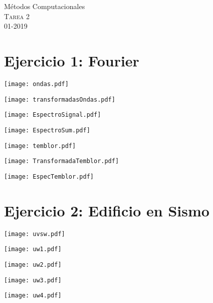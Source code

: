 \documentclass[11pt,letterpaper]{exam}
\begin{document}
\begin{center}
{\Large Métodos Computacionales} \\
\textsc{Tarea 2}\\
01-2019\\
\end{center}

\noindent
\section{Ejercicio 1: Fourier}
\begin{center}
\texttt{[image: ondas.pdf]}
\end{center}

\begin{center}
\texttt{[image: transformadasOndas.pdf]}
\end{center}

\begin{center}
\texttt{[image: EspectroSignal.pdf]}
\end{center}

\begin{center}
\texttt{[image: EspectroSum.pdf]}
\end{center}

\begin{center}
\texttt{[image: temblor.pdf]}
\end{center}

\begin{center}
\texttt{[image: TransformadaTemblor.pdf]}
\end{center}

\begin{center}
\texttt{[image: EspecTemblor.pdf]}
\end{center}

\section{Ejercicio 2: Edificio en Sismo}
\begin{center}
\texttt{[image: uvsw.pdf]}
\end{center}

\begin{center}
\texttt{[image: uw1.pdf]}
\end{center}

\begin{center}
\texttt{[image: uw2.pdf]}
\end{center}

\begin{center}
\texttt{[image: uw3.pdf]}
\end{center}

\begin{center}
\texttt{[image: uw4.pdf]}
\end{center}
\end{document}
